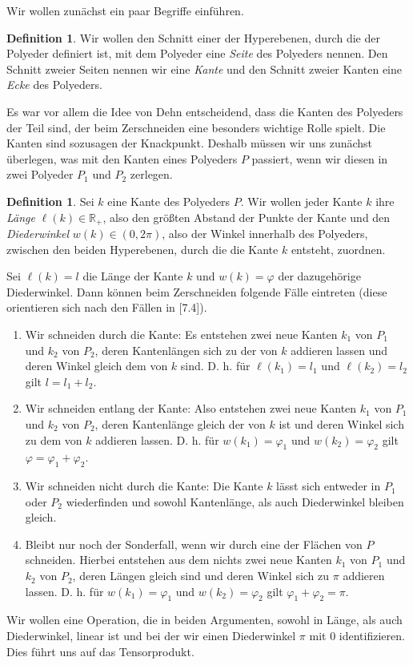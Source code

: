 \documentclass[11pt,titlepage]{article}
\newcommand{\setR}{\mathbb{R}}
\theoremstyle{definition}
\newtheorem{definition}[theorem]{Definition}
\theoremstyle{remark}
\begin{document}
	Wir wollen zunächst ein paar Begriffe einführen.
	\begin{definition}
		Wir wollen den Schnitt 
		einer der Hyperebenen, durch die der Polyeder definiert ist, mit dem 
		Polyeder eine \textsl{Seite} des Polyeders nennen. Den Schnitt 
		zweier Seiten nennen wir eine \textsl{Kante} und den Schnitt zweier 
		Kanten eine \textsl{Ecke} des Polyeders.
	\end{definition}
	Es war vor allem die Idee von Dehn entscheidend, 
	dass die Kanten des Polyeders der Teil sind, der beim Zerschneiden 
	eine besonders wichtige Rolle spielt. Die Kanten sind sozusagen 
	der Knackpunkt.
	Deshalb müssen wir uns zunächst überlegen, was mit den Kanten eines Polyeders $P$ passiert, wenn wir diesen in zwei 
	Polyeder $P_1$ und $P_2$ zerlegen. 
	\begin{definition}
		Sei $k$ eine Kante des Polyeders $P$.  Wir wollen jeder Kante $k$ ihre \textsl{Länge} $\ell(k)\in\setR_+$, also den größten 
		Abstand der Punkte der Kante und den \textsl{Diederwinkel} $w(k)\in(0,2\pi)$, 
		also der Winkel innerhalb des Polyeders, zwischen den beiden Hyperebenen, 
		durch die die Kante $k$ entsteht, zuordnen.
	\end{definition}
	Sei $\ell(k)=l$ die Länge der Kante $k$ und $w(k)=\varphi$ der 
	dazugehörige Diederwinkel. Dann können 
	beim Zerschneiden folgende Fälle eintreten (diese orientieren sich nach 
	den Fällen in \cite{SkriptLA}[7.4]).
	\begin{enumerate}
		\item \label{bem:dehn;1} 
		Wir schneiden durch die Kante: Es entstehen zwei neue Kanten $k_1$ von $P_1$ und $k_2$ von $P_2$, 
		deren Kantenlängen sich zu der von $k$ addieren lassen und deren Winkel gleich dem von $k$ sind. 
		D. h. für $\ell(k_1)=l_1$ und $\ell(k_2)=l_2$ gilt $l=l_1 +l_2$.
		\item \label{bem:dehn;2} 
		Wir schneiden entlang der Kante: Also entstehen zwei neue Kanten $k_1$ von $P_1$ und $k_2$ von 
		$P_2$, deren Kantenlänge gleich der von $k$ ist und deren Winkel sich zu dem von $k$ addieren lassen. 
		D. h. für $w(k_1)=\varphi_1$ und $w(k_2)=\varphi_2$ gilt $\varphi=\varphi_1 +\varphi_2$.
		\item \label{bem:dehn;3} 
		Wir schneiden nicht durch die Kante: Die Kante $k$ lässt sich entweder in $P_1$ oder $P_2$ 
		wiederfinden und sowohl Kantenlänge, als auch Diederwinkel bleiben gleich.
		\item \label{bem:dehn;4} 
		Bleibt nur noch der Sonderfall, wenn wir durch eine der Flächen von $P$ schneiden. Hierbei entstehen 
		aus dem nichts zwei neue Kanten $k_1$ von $P_1$ und $k_2$ von $P_2$, deren Längen gleich sind und deren Winkel sich zu $\pi$ addieren lassen. D. h. für $w(k_1)=\varphi_1$ und 
		$w(k_2)=\varphi_2$ gilt $\varphi_1 +\varphi_2 =\pi$.
	\end{enumerate}
	Wir wollen eine Operation, die in beiden Argumenten, sowohl in Länge, als auch Diederwinkel, linear ist 
	und bei der wir einen Diederwinkel $\pi$ mit $0$ identifizieren. Dies führt uns auf das Tensorprodukt.
	
\end{document}
